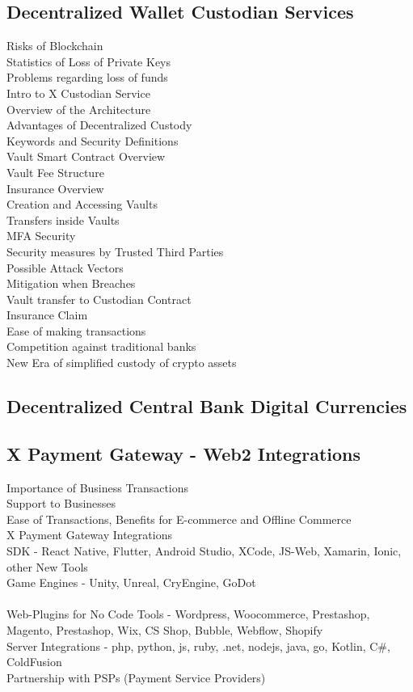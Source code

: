 \documentclass[letterpaper,11pt]{article}
\begin{document}
\subsection{Decentralized Wallet Custodian Services}

Risks of Blockchain\\
Statistics of Loss of Private Keys\\
Problems regarding loss of funds\\
Intro to X Custodian Service\\
Overview of the Architecture\\
Advantages of Decentralized Custody\\
Keywords and Security Definitions\\
Vault Smart Contract Overview\\
Vault Fee Structure\\
Insurance Overview\\
Creation and Accessing Vaults\\		
Transfers inside Vaults\\
MFA Security\\
Security measures by Trusted Third Parties\\
Possible Attack Vectors\\
Mitigation when Breaches\\
Vault transfer to Custodian Contract\\
Insurance Claim\\
Ease of making transactions\\
Competition against traditional banks\\
New Era of simplified custody of crypto assets\\
	
	\subsection{Decentralized Central Bank Digital Currencies}
	
\subsection{X Payment Gateway - Web2 Integrations}

Importance of Business Transactions\\
Support to Businesses\\
Ease of Transactions, Benefits for E-commerce and Offline Commerce\\
X Payment Gateway Integrations\\
SDK - React Native, Flutter, Android Studio, XCode, JS-Web, Xamarin, Ionic, other New Tools \\
Game Engines - Unity, Unreal, CryEngine, GoDot\\
\\
Web-Plugins for No Code Tools - Wordpress, Woocommerce, Prestashop, Magento, Prestashop, Wix, CS Shop, Bubble, Webflow, Shopify\\
Server Integrations - php, python, js, ruby, .net, nodejs, java, go, Kotlin, C\#, ColdFusion\\
Partnership with PSPs (Payment Service Providers)\\	
	
\end{document}
